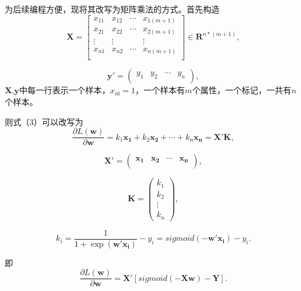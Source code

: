 \documentclass[withoutpreface,bwprint]{cumcmthesis}
\begin{document}
为后续编程方便，现将其改写为矩阵乘法的方式。首先构造
\begin{equation*}
\boldsymbol{X}=
\begin{bmatrix}
x_{11}  &x_{12}  & \cdots & x_{1(m+1)}\\ 
x_{21}  &x_{22}  & \cdots & x_{2(m+1)}\\ 
\vdots  &\vdots  &        &\vdots \\ 
x_{n1}  &x_{n2}  & \cdots & x_{n(m+1)}\\ 
\end{bmatrix}
\in \boldsymbol{R}^{n*\left(m+1\right)},
\end{equation*}

\begin{equation*}
{\boldsymbol{y}}'=
\begin{pmatrix}
y_{1} & y_{2} &\cdots & y_{n}\\
\end{pmatrix},
\end{equation*}
$\boldsymbol{X}$,$\boldsymbol{y}$中每一行表示一个样本，$x_{i0}=1$，一个样本有$m$个属性，一个标记，一共有$n$个样本。

则式（3）可以改写为
\begin{equation*}
\frac{\partial{L(\boldsymbol{w})}}{\partial{\boldsymbol{w}}}
=k_{1}\boldsymbol{x_{1}}+k_{2}\boldsymbol{x_{2}}+\cdots+k_{n}\boldsymbol{x_{n}}=\boldsymbol{X'K},
\end{equation*}

\begin{equation*}
{\boldsymbol{X'}}=
\begin{pmatrix}
\boldsymbol{x_{1}} & \boldsymbol{x_{2}} &\cdots & \boldsymbol{x_{n}}\\
\end{pmatrix},
\end{equation*}

\begin{equation*}
{\boldsymbol{K}}=
\begin{pmatrix}
k_{1}\\k_{2}\\ \vdots\\ k_{n}
\end{pmatrix},
\end{equation*}

\begin{equation*}
k_{i}=\frac{1}{1+\exp(\boldsymbol{w'x_{i}})}-y_{i}=sigmoid(-\boldsymbol{w'x_{i}})-y_{i}.
\end{equation*}

即
\begin{equation*}
\frac{\partial{L(\boldsymbol{w})}}{\partial{\boldsymbol{w}}}=\boldsymbol{X'}[sigmoid(-\boldsymbol{Xw})-\boldsymbol{Y}].
\end{equation*}
\end{document}
